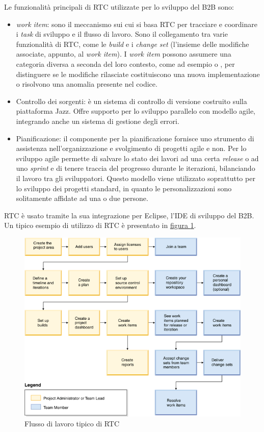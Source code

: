 Le funzionalità principali di RTC utilizzate per lo sviluppo del B2B sono:
\begin{itemize}
	\item \textit{work item}: sono il meccanismo sui cui si basa RTC per tracciare e coordinare i \textit{task} di sviluppo e il flusso di lavoro. Sono il collegamento tra varie funzionalità di RTC, come le \textit{build} e i \textit{change set} (l'insieme delle modifiche associate, appunto, al\textit{ work item}). I \textit{work item} possono assumere una categoria diversa a seconda del loro contesto, come ad esempio  o , per distinguere se le modifiche rilasciate costituiscono una nuova implementazione o risolvono una anomalia presente nel codice.
	\item Controllo dei sorgenti: è un sistema di controllo di versione costruito sulla piattaforma Jazz. Offre supporto per lo sviluppo parallelo con modello agile, integrando anche un sistema di gestione degli errori.
	\item Pianificazione: il componente per la pianificazione fornisce uno strumento di assistenza nell'organizzazione e svolgimento di progetti agile e non. Per lo sviluppo agile permette di salvare lo stato dei lavori ad una certa \textit{release} o ad uno \textit{sprint} e di tenere traccia del progresso durante le iterazioni, bilanciando il lavoro tra gli sviluppatori. Questo modello viene utilizzato soprattutto per lo sviluppo dei progetti standard, in quanto le personalizzazioni sono solitamente affidate ad una o due persone.
\end{itemize}
RTC è usato tramite la sua integrazione per Eclipse, l'IDE di sviluppo del B2B. Un tipico esempio di utilizzo di RTC è presentato in \hyperref[fig:rtc]{figura \ref{fig:rtc}}.
\begin{figure}[H]
	\centering
	\includegraphics[width=14cm]{Immagini/rtc-task-flow.png}
	\caption{Flusso di lavoro tipico di RTC}
	\label{fig:rtc}
\end{figure}

